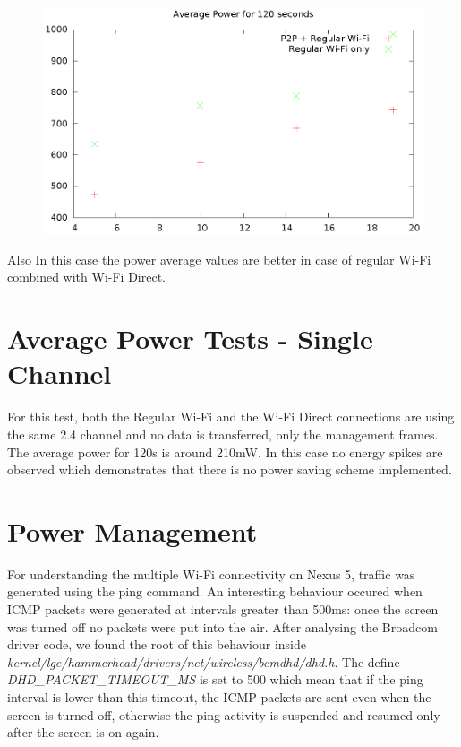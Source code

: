 \begin{figure}
\includegraphics{src/img/powervaluesparallel.eps}
\end{figure}

Also In this case the power average values are better in case of regular Wi-Fi combined with Wi-Fi Direct.

\section{Average Power Tests - Single Channel}
\label{sec:nexus5-consumption}

For this test, both the Regular Wi-Fi and the Wi-Fi Direct connections are using the same 2.4 channel and no data is transferred, only the management frames. The average power for 120s is around 210mW. In this case no energy spikes are observed which demonstrates that there is no power saving scheme implemented.



\section{Power Management}
\label{sec:PowerManagement}

For understanding the multiple Wi-Fi connectivity on Nexus 5, traffic was generated using the ping command. An interesting behaviour occured when ICMP packets were generated at intervals greater than 500ms: once the screen was turned off no packets were put into the air. After analysing the Broadcom driver code, we found the root of this behaviour inside \textit{kernel/lge/hammerhead/drivers/net/wireless/bcmdhd/dhd.h}. The define \textit{DHD_PACKET_TIMEOUT_MS} is set to 500 which mean that if the ping interval is lower than this timeout, the ICMP packets are sent even when the screen is turned off, otherwise the ping activity is suspended and resumed only after the screen is on again. 

